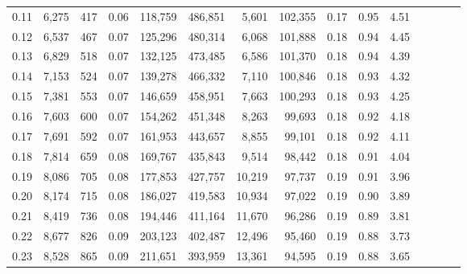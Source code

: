 \begin{tabular}{rrrcrrrrrrrrrrr}
0.11 &   6,275 &     417 &                                       0.06 &  118,759 &  486,851 &    5,601 &  102,355 &  0.17 &  0.95 &                         4.51 \\
0.12 &   6,537 &     467 &                                       0.07 &  125,296 &  480,314 &    6,068 &  101,888 &  0.18 &  0.94 &                         4.45 \\
0.13 &   6,829 &     518 &                                       0.07 &  132,125 &  473,485 &    6,586 &  101,370 &  0.18 &  0.94 &                         4.39 \\
0.14 &   7,153 &     524 &                                       0.07 &  139,278 &  466,332 &    7,110 &  100,846 &  0.18 &  0.93 &                         4.32 \\
0.15 &   7,381 &     553 &                                       0.07 &  146,659 &  458,951 &    7,663 &  100,293 &  0.18 &  0.93 &                         4.25 \\
0.16 &   7,603 &     600 &                                       0.07 &  154,262 &  451,348 &    8,263 &   99,693 &  0.18 &  0.92 &                         4.18 \\
0.17 &   7,691 &     592 &                                       0.07 &  161,953 &  443,657 &    8,855 &   99,101 &  0.18 &  0.92 &                         4.11 \\
0.18 &   7,814 &     659 &                                       0.08 &  169,767 &  435,843 &    9,514 &   98,442 &  0.18 &  0.91 &                         4.04 \\
0.19 &   8,086 &     705 &                                       0.08 &  177,853 &  427,757 &   10,219 &   97,737 &  0.19 &  0.91 &                         3.96 \\
0.20 &   8,174 &     715 &                                       0.08 &  186,027 &  419,583 &   10,934 &   97,022 &  0.19 &  0.90 &                         3.89 \\
0.21 &   8,419 &     736 &                                       0.08 &  194,446 &  411,164 &   11,670 &   96,286 &  0.19 &  0.89 &                         3.81 \\
0.22 &   8,677 &     826 &                                       0.09 &  203,123 &  402,487 &   12,496 &   95,460 &  0.19 &  0.88 &                         3.73 \\
0.23 &   8,528 &     865 &                                       0.09 &  211,651 &  393,959 &   13,361 &   94,595 &  0.19 &  0.88 &                         3.65 \\

\end{tabular}
